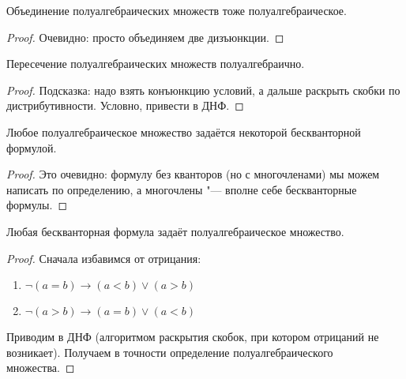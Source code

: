 	\begin{assertion}
		Объединение полуалгебраических множеств тоже полуалгебраическое.
	\end{assertion}
	\begin{proof}
		Очевидно: просто объединяем две дизъюнкции.
	\end{proof}

	\begin{Exercise}
		Пересечение полуалгебраических множеств полуалгебраично.
	\end{Exercise}
	\begin{proof}
		Подсказка: надо взять конъюнкцию условий, а дальше раскрыть скобки по дистрибутивности.
		Условно, привести в ДНФ.
	\end{proof}

	\begin{assertion}
		Любое полуалгебраическое множество задаётся некоторой бескванторной формулой.
	\end{assertion}
	\begin{proof}
		Это очевидно: формулу без кванторов (но с многочленами) мы можем написать по определению, а многочлены "--- вполне себе бескванторные формулы.
	\end{proof}

	\begin{assertion}
		Любая бескванторная формула задаёт полуалгебраическое множество.
	\end{assertion}
	\begin{proof}
		Сначала избавимся от отрицания:
		\begin{enumerate}
			\item $\lnot (a = b) \longrightarrow (a < b) \lor (a > b)$
			\item $\lnot (a > b) \longrightarrow (a = b) \lor (a < b)$
		\end{enumerate}
		Приводим в ДНФ (алгоритмом раскрытия скобок, при котором отрицаний не возникает).
		Получаем в точности определение полуалгебраического множества.
	\end{proof}

